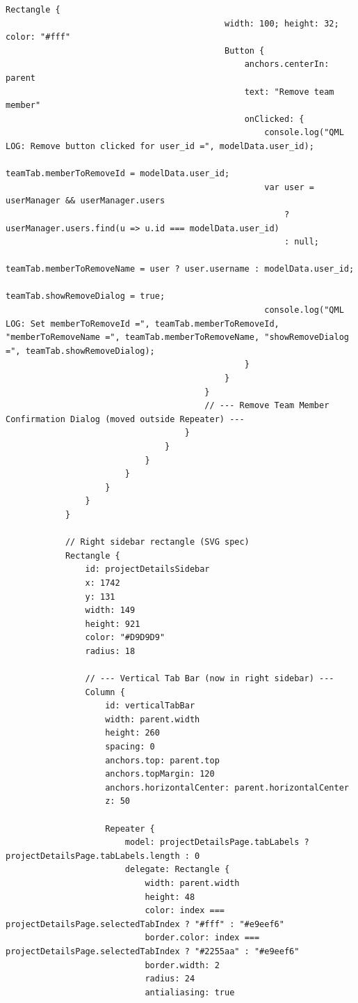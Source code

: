 \documentclass{report}
\begin{document}
\begin{lstlisting}[style=qmlstyle]
                                        Rectangle {
                                            width: 100; height: 32; color: "#fff"
                                            Button {
                                                anchors.centerIn: parent
                                                text: "Remove team member"
                                                onClicked: {
                                                    console.log("QML LOG: Remove button clicked for user_id =", modelData.user_id);
                                                    teamTab.memberToRemoveId = modelData.user_id;
                                                    var user = userManager && userManager.users
                                                        ? userManager.users.find(u => u.id === modelData.user_id)
                                                        : null;
                                                    teamTab.memberToRemoveName = user ? user.username : modelData.user_id;
                                                    teamTab.showRemoveDialog = true;
                                                    console.log("QML LOG: Set memberToRemoveId =", teamTab.memberToRemoveId, "memberToRemoveName =", teamTab.memberToRemoveName, "showRemoveDialog =", teamTab.showRemoveDialog);
                                                }
                                            }
                                        }
                                        // --- Remove Team Member Confirmation Dialog (moved outside Repeater) ---
                                    }
                                }
                            }
                        }
                    }
                }
            }

            // Right sidebar rectangle (SVG spec)
            Rectangle {
                id: projectDetailsSidebar
                x: 1742
                y: 131
                width: 149
                height: 921
                color: "#D9D9D9"
                radius: 18

                // --- Vertical Tab Bar (now in right sidebar) ---
                Column {
                    id: verticalTabBar
                    width: parent.width
                    height: 260
                    spacing: 0
                    anchors.top: parent.top
                    anchors.topMargin: 120
                    anchors.horizontalCenter: parent.horizontalCenter
                    z: 50

                    Repeater {
                        model: projectDetailsPage.tabLabels ? projectDetailsPage.tabLabels.length : 0
                        delegate: Rectangle {
                            width: parent.width
                            height: 48
                            color: index === projectDetailsPage.selectedTabIndex ? "#fff" : "#e9eef6"
                            border.color: index === projectDetailsPage.selectedTabIndex ? "#2255aa" : "#e9eef6"
                            border.width: 2
                            radius: 24
                            antialiasing: true


\end{lstlisting}
\end{document}
